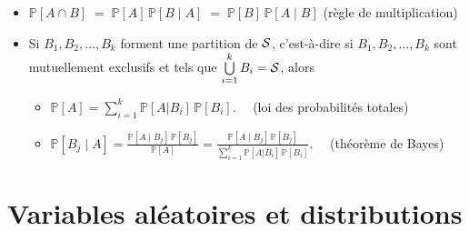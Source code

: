 \documentclass[12pt,french]{article}
\begin{document}
\begin{itemize}
\begin{itemize}
\item ${\mathbb P}[A \cap B] \;=\; {\mathbb P}[A]\,{\mathbb P}[B\mid A]
\;=\;{\mathbb P}[B]\,{\mathbb P}[A\mid B]$ (r\`egle de multiplication)



\item Si $B_1, B_2, ..., B_k$ forment une partition de ${\cal S}$,
c'est-\`a-dire si $B_1, B_2, ..., B_k$ sont mutuellement exclusifs
et tels que $\bigcup\limits_{i=1}^k B_i={\cal S}$, alors
\begin{itemize}

\item[$\circ$]
$\displaystyle
{\mathbb P}[A] = \sum_{i=1}^{k}{\mathbb P}[A|B_i]\,{\mathbb P}[B_i]
$.
~~(loi des probabilit\'es totales)

\item[$\circ$]
$\displaystyle
{\mathbb P}[B_j\mid A] =
\frac{{\mathbb P}[A\mid B_j]\,{\mathbb P}[B_j]}{{\mathbb P}[A]}
=\frac{{\mathbb P}[A\mid B_j]\,{\mathbb P}[B_j]}{\sum_{i=1}^{k}{\mathbb P}[A|B_i]\,{\mathbb P}[B_i]}
$.
~~(th\'eor\`eme de Bayes)

\end{itemize}
\end{itemize}
\end{itemize}


\section*{Variables al\'eatoires et distributions}

\end{document}
